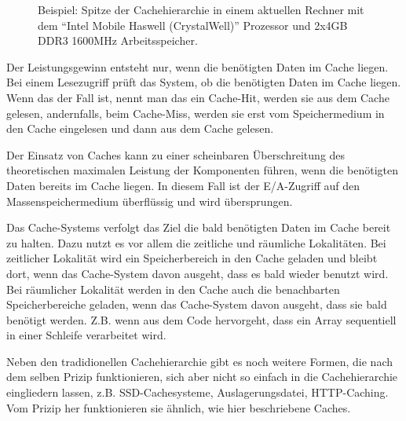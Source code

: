 \begin{figure}[ht]
	\hfill
	\hfill
	\subfigure[Cachegröße]{
		
		\label{fig:bas:memsize}
	}
	\hfill
	\caption{Beispiel: Spitze der Cachehierarchie in einem aktuellen Rechner mit dem ``Intel Mobile Haswell (CrystalWell)'' Prozessor und 2x4GB DDR3 1600MHz Arbeitsspeicher\cite{cache}.}
	\label{fig:bas:sizeperf}
\end{figure}


Der Leistungsgewinn entsteht nur, wenn die benötigten Daten im Cache liegen.
Bei einem Lesezugriff prüft das System, ob die benötigten Daten im Cache liegen. 
Wenn das der Fall ist, nennt man das ein Cache-Hit, werden sie aus dem Cache gelesen, andernfalls, beim Cache-Miss, werden sie erst vom Speichermedium in den Cache eingelesen und dann aus dem Cache gelesen. 

Der Einsatz von Caches kann zu einer scheinbaren Überschreitung des theoretischen maximalen Leistung der Komponenten führen, wenn die benötigten Daten bereits im Cache liegen. 
In diesem Fall ist der E/A-Zugriff auf den Massenspeichermedium überflüssig und wird übersprungen. 

Das Cache-Systems verfolgt das Ziel die bald benötigten Daten im Cache bereit zu halten.
Dazu nutzt es vor allem die zeitliche und räumliche Lokalitäten.
Bei zeitlicher Lokalität wird ein Speicherbereich in den Cache geladen und bleibt dort, wenn das Cache-System davon ausgeht, dass es bald wieder benutzt wird.
Bei räumlicher Lokalität werden in den Cache auch die benachbarten Speicherbereiche geladen, wenn das Cache-System davon ausgeht, dass sie bald benötigt werden. 
Z.B. wenn aus dem Code hervorgeht, dass ein Array sequentiell in einer Schleife verarbeitet wird.

Neben den tradidionellen Cachehierarchie gibt es noch weitere Formen, die nach dem selben Prizip funktionieren, sich aber nicht so einfach in die Cachehierarchie eingliedern lassen, z.B. SSD-Cachesysteme, Auslagerungsdatei, HTTP-Caching. Vom Prizip her funktionieren sie ähnlich, wie hier beschriebene Caches.




